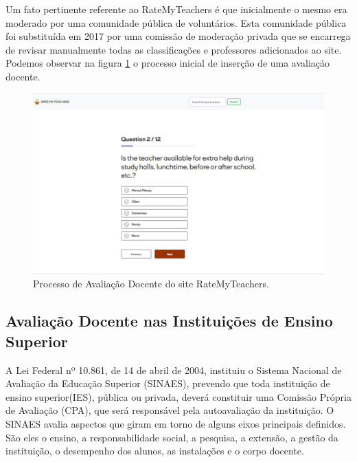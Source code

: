 \documentclass[12pt, a4paper]{report}
\begin{document}
Um fato pertinente referente ao RateMyTeachers é que inicialmente o mesmo era moderado por uma comunidade pública de voluntários. Esta comunidade pública foi substituída em 2017 por uma comissão de moderação privada que se encarrega de revisar manualmente todas as classificações e professores adicionados ao site. Podemos observar na figura \ref{fig:ratemyteacher} o processo inicial de inserção de uma avaliação docente.

\begin{figure}
\centering
\includegraphics[scale=0.45]{ratemyteachers.png}
\caption{Processo de Avaliação Docente do site RateMyTeachers.}
\label{fig:ratemyteacher}
\end{figure}

\subsection{Avaliação Docente nas Instituições de Ensino Superior}

 A Lei Federal nº 10.861, de 14 de abril de 2004, instituiu o Sistema Nacional de Avaliação da Educação Superior (SINAES), prevendo que toda instituição de ensino superior(IES), pública ou privada, deverá constituir uma Comissão Própria de Avaliação (CPA), que será responsável pela autoavaliação da instituição. O SINAES avalia aspectos que giram em torno de alguns eixos principais definidos. São eles o ensino, a responsabilidade social, a pesquisa, a extensão, a gestão da instituição, o desempenho dos alunos, as instalações e o corpo docente.
 
 
\end{document}
